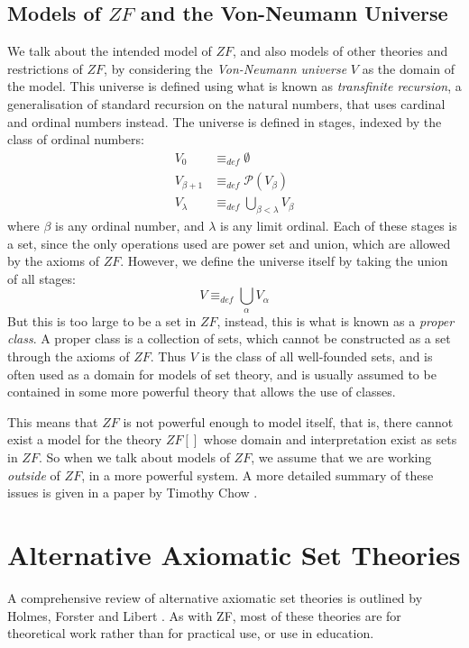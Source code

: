 \documentclass[11pt]{report}
\newcommand{\eqdef}{\equiv_\mathit{def}}
\theoremstyle{definition}
\theoremstyle{theorem}
\theoremstyle{lemma}
\begin{document}
\subsection{Models of $\mathit{ZF}$ and the Von-Neumann Universe}
We talk about the intended model of $\mathit{ZF}$, and also models of other theories and restrictions of $ZF$, by considering the \emph{Von-Neumann universe} $V$ as the domain of the model. This universe is defined using what is known as \emph{transfinite recursion}, a generalisation of standard recursion on the natural numbers, that uses cardinal and ordinal numbers instead. The universe is defined in stages, indexed by the class of ordinal numbers:
\begin{align*}
  V_0 &\eqdef \emptyset \\
  V_{\beta+1} &\eqdef \mathcal{P}(V_\beta)\\
  V_{\lambda} &\eqdef \bigcup_{\beta<\lambda} V_\beta
\end{align*}
where $\beta$ is any ordinal number, and $\lambda$ is any limit ordinal.
Each of these stages is a set, since the only operations used are power set and union, which are allowed by the axioms of $\mathit{ZF}$. However, we define the universe itself by taking the union of all stages:
$$V \eqdef \bigcup_\alpha V_\alpha$$
But this is too large to be a set in $\mathit{ZF}$, instead, this is what is known as a \emph{proper class}.
A proper class is a collection of sets, which cannot be constructed as a set through the axioms of $\mathit{ZF}$.
Thus $V$ is the class of all well-founded sets, and is often used as a domain for models of set theory, and is usually assumed to be contained in some more powerful theory that allows the use of classes.

This means that $\mathit{ZF}$ is not powerful enough to model itself, that is, there cannot exist a model for the theory $\mathit{ZF}[]$ whose domain and interpretation exist as sets in $\mathit{ZF}$.
So when we talk about models of $ZF$, we assume that we are working \emph{outside} of $\mathit{ZF}$, in a more powerful system. A more detailed summary of these issues is given in a paper by Timothy Chow \cite{force}.

\section{Alternative Axiomatic Set Theories}
A comprehensive review of alternative axiomatic set theories is outlined by Holmes, Forster and Libert \cite{ast}.
As with ZF, most of these theories are for theoretical work rather than for practical use, or use in education.
\end{document}
